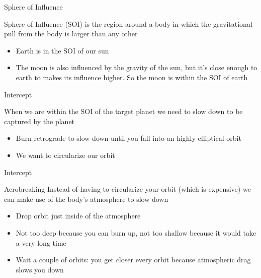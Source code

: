 {
%
\begin{frame}
\end{frame}
\begin{frame}[t]{Sphere of Influence}
    \begin{block}{}
    Sphere of Influence (SOI) is the region around a body in which the gravitational pull from the body is larger
    than any other
    \begin{itemize}
        \item Earth is in the SOI of our sun
        \item The moon is also influenced by the gravity of the sun, but it's close enough to earth to makes its
            influence higher. So the moon is within the SOI of earth
    \end{itemize}
    \end{block}
\end{frame}
\begin{frame}[t]{Intercept}
    \begin{block}{}
        When we are within the SOI of the target planet we need to slow down to be captured by the planet
        \begin{itemize}
            \item Burn retrograde to slow down until you fall into an highly elliptical orbit
            \item We want to circularize our orbit
        \end{itemize}
    \end{block}
\end{frame}
\begin{frame}[t]{Intercept}
    \begin{block}{Aerobreaking}
        Instead of having to circularize your orbit (which is expensive) we can make use of the body's atmosphere to
        slow down
        \begin{itemize}
            \item Drop orbit just inside of the atmosphere
            \item Not too deep because you can burn up, not too shallow because it would take a very long time
            \item Wait a couple of orbits: you get closer every orbit because atmospheric drag slows you down
        \end{itemize}
    \end{block}
\end{frame}
}
